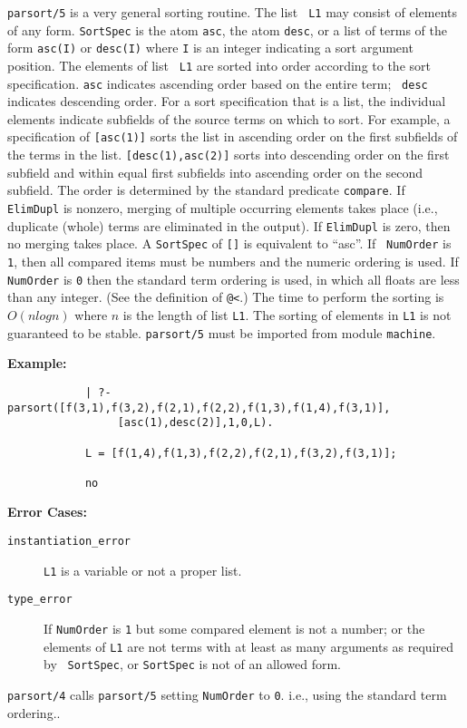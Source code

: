 \begin{description}
%
    {\tt parsort/5} is a very general sorting routine.  The list {\tt
      L1} may consist of elements of any form.  {\tt SortSpec} is the
    atom {\tt asc}, the atom {\tt desc}, or a list of terms of the
    form {\tt asc(I)} or {\tt desc(I)} where {\tt I} is an integer
    indicating a sort argument position.  The elements of list {\tt
      L1} are sorted into order according to the sort specification.
    {\tt asc} indicates ascending order based on the entire term; {\tt
      desc} indicates descending order.  For a sort specification that
    is a list, the individual elements indicate subfields of the
    source terms on which to sort.  For example, a specification of
    {\tt [asc(1)]} sorts the list in ascending order on the first
    subfields of the terms in the list.  {\tt [desc(1),asc(2)]} sorts
    into descending order on the first subfield and within equal first
    subfields into ascending order on the second subfield.  The order
    is determined by the standard predicate {\tt compare}.  If {\tt
      ElimDupl} is nonzero, merging of multiple occurring elements
    takes place (i.e., duplicate (whole) terms are eliminated in the
    output).  If {\tt ElimDupl} is zero, then no merging takes place.
    A {\tt SortSpec} of {\tt []} is equivalent to ``asc''.  If {\tt
      NumOrder} is {\tt 1}, then all compared items must be numbers
    and the numeric ordering is used.  If {\tt NumOrder} is {\tt 0}
    then the standard term ordering is used, in which all floats are
    less than any integer.  (See the definition of {\tt @<}.)  The
    time to perform the sorting is $O(n log n)$ where $n$ is the
    length of list {\tt L1}.  The sorting of elements in {\tt L1} is
    not guaranteed to be stable. {\tt parsort/5} must be imported from
    module {\tt machine}.

{\bf     Example:}
    {\footnotesize
     \begin{verbatim}
            | ?- parsort([f(3,1),f(3,2),f(2,1),f(2,2),f(1,3),f(1,4),f(3,1)],
                 [asc(1),desc(2)],1,0,L). 

            L = [f(1,4),f(1,3),f(2,2),f(2,1),f(3,2),f(3,1)];

            no \end{verbatim}}

{\bf Error Cases:}
\begin{description} 
\item[{\tt instantiation\_error}]
     {\tt L1} is a variable or not a proper list.  
\item[{\tt type\_error}] If {\tt NumOrder} is {\tt 1} but some
  compared element is not a number; or the elements of {\tt L1} are
  not terms with at least as many arguments as required by {\tt
    SortSpec}, or {\tt SortSpec} is not of an allowed form.
\end{description}

 {\tt parsort/4} calls {\tt parsort/5}
setting {\tt NumOrder} to {\tt 0}. i.e., using the standard term
ordering..

\end{description}

